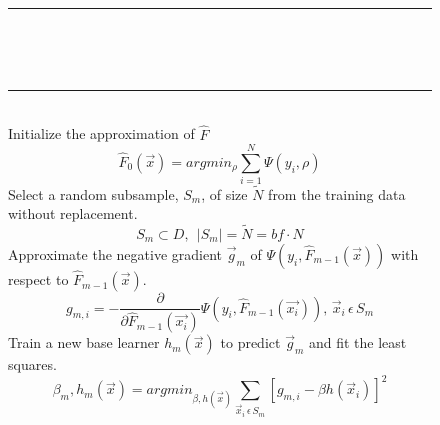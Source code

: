 \documentclass[9pt, conference]{IEEEtran}
\makeatletter
\newcommand{\removelatexerror}{\let\@latex@error\@gobble}
\makeatother
\begin{document}
\begin{figure}[t]
	\removelatexerror
	\begin{algorithm}[H]
		\hspace{1 mm} \\\hrule\hspace{1 mm} \\
		
		\hspace{1 mm} \\\hrule\hspace{1 mm} \\
		Initialize the  approximation of \(\hat{F}\)
		\begin{equation}
		\hat{F}_0(\vec{x}) = argmin_\rho \sum_{i=1}^{N}\Psi(y_i, \rho) 
		\end{equation}
		{
			Select a random subsample, \(S_m\), of size \(\tilde{N}\) from the training data without replacement.
			\begin{equation}
			S_m \subset D, \ \  |S_m| = \tilde{N} =  bf  \cdot  N 
			\end{equation}
			Approximate the negative gradient \(\vec{g}_m\) of \(\Psi(y_i, \hat{F}_{m-1} (\vec{x}) ) \) with respect to \(\hat{F}_{m-1} (\vec{x})\).
			\begin{equation}
			g_{m,i} = -\frac{\partial}{\partial \hat{F}_{m-1}(\vec{x_i})} \Psi(y_i, \hat{F}_{m-1}(\vec{x_i})), \, \vec{x}_i \, \epsilon \, S_m
			\label{eq:NegativeGradient}
			\end{equation}
			Train a new base learner \(h_m(\vec{x})\) to predict \(\vec{g}_m\) and fit the least squares.
			\begin{equation}
			\beta_m, h_m(\vec{x}) = argmin_{\beta, h(\vec{x})}\sum_{\vec{x}_i \, \epsilon \, S_m}[ g_{m,i} - \beta h(\vec{x}_i)]^2
			\label{eq:NewBaseLearner}

\end{equation}}
\end{algorithm}
\end{figure}
\end{document}
